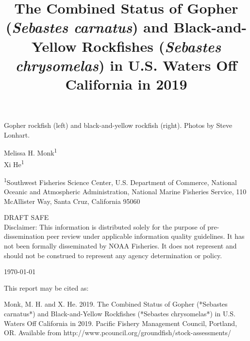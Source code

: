 \documentclass[12pt,]{article}
\title{The Combined Status of Gopher (\emph{Sebastes carnatus}) and
Black-and-Yellow Rockfishes (\emph{Sebastes chrysomelas}) in U.S. Waters
Off California in 2019}
\author{}
\date{}
\begin{document}
\maketitle


\begin{center}
\thispagestyle{empty}


\vspace{.5cm}

Gopher rockfish (left) and black-and-yellow rockfish (right).      
\small
Photos by Steve Lonhart.

\vspace{.3cm}


Melissa H. Monk\textsuperscript{1}\\
Xi He\textsuperscript{1}\\

\vspace{.5cm}

\small
\textsuperscript{1}Southwest Fisheries Science Center, U.S. Department of Commerce, National Oceanic and Atmospheric Administration, National Marine Fisheries Service, 110 McAllister Way, Santa Cruz, California 95060\\

\vspace{1.5cm}


DRAFT SAFE\\
Disclaimer: This information is distributed solely for the purpose of pre-dissemination
peer review under applicable information quality guidelines. It has not been formally
disseminated by NOAA Fisheries. It does not represent and should not be construed to
represent any agency determination or policy. 

\vspace{.1cm}
{\large \today}


\newpage{\thispagestyle{empty}}


\begin{flushleft}
This report may be cited as:

Monk, M. H.  and X. He. 2019. The Combined Status of Gopher (*Sebastes carnatus*) and Black-and-Yellow Rockfishes (*Sebastes chrysomelas*) in U.S. Waters Off California in 2019. Pacific Fishery Management Council, Portland, OR. Available from http://www.pcouncil.org/groundfish/stock-assessments/
\end{flushleft}

\maketitle

\setcounter{page}{1}
\end{center}
\end{document}

